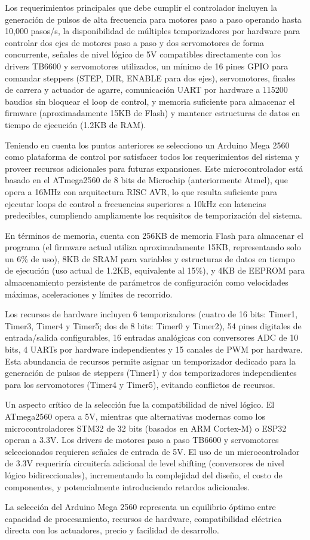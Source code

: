 Los requerimientos principales que debe cumplir el controlador incluyen la generación de pulsos de alta frecuencia para motores paso a paso operando hasta 10,000 pasos/s, la disponibilidad de múltiples temporizadores por hardware para controlar dos ejes de motores paso a paso y dos servomotores de forma concurrente, señales de nivel lógico de 5V compatibles directamente con los drivers TB6600 y servomotores utilizados, un mínimo de 16 pines GPIO para comandar steppers (STEP, DIR, ENABLE para dos ejes), servomotores, finales de carrera y actuador de agarre, comunicación UART por hardware a 115200 baudios sin bloquear el loop de control, y memoria suficiente para almacenar el firmware (aproximadamente 15KB de Flash) y mantener estructuras de datos en tiempo de ejecución (1.2KB de RAM).

Teniendo en cuenta los puntos anteriores se selecciono un Arduino Mega 2560 como plataforma de control por satisfacer todos los requerimientos del sistema y proveer recursos adicionales para futuras expansiones. Este microcontrolador está basado en el ATmega2560 de 8 bits de Microchip (anteriormente Atmel), que opera a 16MHz con arquitectura RISC AVR, lo que resulta suficiente para ejecutar loops de control a frecuencias superiores a 10kHz con latencias predecibles, cumpliendo ampliamente los requisitos de temporización del sistema.

En términos de memoria, cuenta con 256KB de memoria Flash para almacenar el programa (el firmware actual utiliza aproximadamente 15KB, representando solo un 6\% de uso), 8KB de SRAM para variables y estructuras de datos en tiempo de ejecución (uso actual de 1.2KB, equivalente al 15\%), y 4KB de EEPROM para almacenamiento persistente de parámetros de configuración como velocidades máximas, aceleraciones y límites de recorrido.

Los recursos de hardware incluyen 6 temporizadores (cuatro de 16 bits: Timer1, Timer3, Timer4 y Timer5; dos de 8 bits: Timer0 y Timer2), 54 pines digitales de entrada/salida configurables, 16 entradas analógicas con conversores ADC de 10 bits, 4 UARTs por hardware independientes y 15 canales de PWM por hardware. Esta abundancia de recursos permite asignar un temporizador dedicado para la generación de pulsos de steppers (Timer1) y dos temporizadores independientes para los servomotores (Timer4 y Timer5), evitando conflictos de recursos.

Un aspecto crítico de la selección fue la compatibilidad de nivel lógico. El ATmega2560 opera a 5V, mientras que alternativas modernas como los microcontroladores STM32 de 32 bits (basados en ARM Cortex-M) o ESP32 operan a 3.3V. Los drivers de motores paso a paso TB6600 y servomotores seleccionados requieren señales de entrada de 5V. El uso de un microcontrolador de 3.3V requeriría circuitería adicional de level shifting (conversores de nivel lógico bidireccionales), incrementando la complejidad del diseño, el costo de componentes, y potencialmente introduciendo retardos adicionales.

La selección del Arduino Mega 2560 representa un equilibrio óptimo entre capacidad de procesamiento, recursos de hardware, compatibilidad eléctrica directa con los actuadores, precio y facilidad de desarrollo.